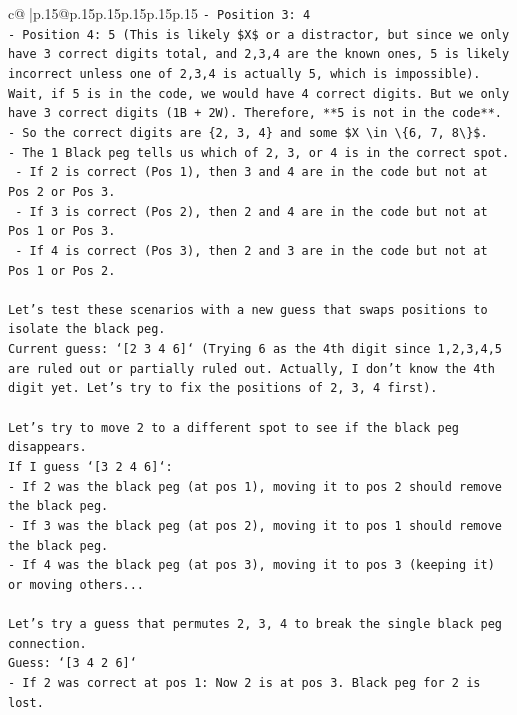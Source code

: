 \documentclass{article}
\begin{document}
{\begin{supertabular}{c@{$\;$}|p{.15\linewidth}@{}p{.15\linewidth}p{.15\linewidth}p{.15\linewidth}p{.15\linewidth}p{.15\linewidth}}
{{{\texttt{{-} Position 3: 4} \\
\texttt{{-} Position 4: 5 (This is likely \$X\$ or a distractor, but since we only have 3 correct digits total, and 2,3,4 are the known ones, 5 is likely incorrect unless one of 2,3,4 is actually 5, which is impossible). Wait, if 5 is in the code, we would have 4 correct digits. But we only have 3 correct digits (1B + 2W). Therefore, **5 is not in the code**.} \\
\texttt{{-} So the correct digits are \{2, 3, 4\} and some \$X \textbackslash{}in \textbackslash{}\{6, 7, 8\textbackslash{}\}\$.} \\
\texttt{{-} The 1 Black peg tells us which of 2, 3, or 4 is in the correct spot.} \\
\texttt{    {-} If 2 is correct (Pos 1), then 3 and 4 are in the code but not at Pos 2 or Pos 3.} \\
\texttt{    {-} If 3 is correct (Pos 2), then 2 and 4 are in the code but not at Pos 1 or Pos 3.} \\
\texttt{    {-} If 4 is correct (Pos 3), then 2 and 3 are in the code but not at Pos 1 or Pos 2.} \\
\\ 
\texttt{Let's test these scenarios with a new guess that swaps positions to isolate the black peg.} \\
\texttt{Current guess: `{[}2 3 4 6{]}` (Trying 6 as the 4th digit since 1,2,3,4,5 are ruled out or partially ruled out. Actually, I don't know the 4th digit yet. Let's try to fix the positions of 2, 3, 4 first).} \\
\\ 
\texttt{Let's try to move 2 to a different spot to see if the black peg disappears.} \\
\texttt{If I guess `{[}3 2 4 6{]}`:} \\
\texttt{{-} If 2 was the black peg (at pos 1), moving it to pos 2 should remove the black peg.} \\
\texttt{{-} If 3 was the black peg (at pos 2), moving it to pos 1 should remove the black peg.} \\
\texttt{{-} If 4 was the black peg (at pos 3), moving it to pos 3 (keeping it) or moving others...} \\
\\ 
\texttt{Let's try a guess that permutes 2, 3, 4 to break the single black peg connection.} \\
\texttt{Guess: `{[}3 4 2 6{]}`} \\
\texttt{{-} If 2 was correct at pos 1: Now 2 is at pos 3. Black peg for 2 is lost.} \\
}}}
\end{supertabular}}
\end{document}
